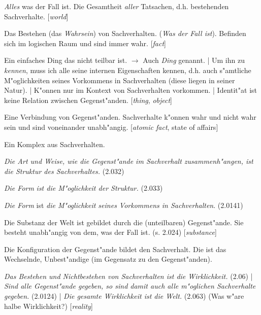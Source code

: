 \documentclass[]{scrartcl}
\begin{document}
\begin{description}[leftmargin=!,labelwidth=\widthof{\bfseries Konfiguration}]
  \item[Welt] \emph{Alles} was der Fall ist. Die Gesamtheit \emph{aller} Tatsachen, d.h.  bestehenden Sachverhalte. [\emph{world}]
  \item[Tatsache] Das Bestehen (das \emph{Wahrsein}) von Sachverhalten. (\emph{Was der Fall ist}). Befinden sich im logischen Raum und sind immer wahr. [\emph{fact}]
  \item[Gegenstand] Ein einfaches Ding das nicht teilbar ist. $\rightarrow$ Auch \emph{Ding} genannt. | Um ihn zu \emph{kennen}, muss ich alle seine internen Eigenschaften kennen, d.h. auch s"amtliche M"oglichkeiten seines Vorkommens in Sachverhalten (diese liegen in seiner Natur). | K"onnen nur im Kontext von Sachverhalten vorkommen. | Identit"at ist keine Relation zwischen Gegenst"anden. [\emph{thing}, \emph{object}]
  \item[Sachverhalt] Eine Verbindung von Gegenst"anden. Sachverhalte k"onnen wahr und nicht wahr sein und sind voneinander unabh"angig. [\emph{atomic fact}, {state of affairs}]
  \item[Sachlage] Ein Komplex aus Sachverhalten.
  \item[Struktur] \emph{Die Art und Weise, wie die Gegenst"ande im Sachverhalt zusammenh"angen, ist die Struktur des Sachverhaltes.} (2.032)
  \item[Form des ??] \emph{Die Form} \emph{ist die M"oglichkeit der Struktur.} (2.033)  \item[Form des Gegenstands] \emph{Die Form} ist \emph{die M"oglichkeit seines Vorkommens in Sachverhalten}. (2.0141)
  \item[Substanz] Die Substanz der Welt ist gebildet durch die (unteilbaren) Gegenst"ande. Sie besteht unabh"angig von dem, was der Fall ist. (s. 2.024) [\emph{substance}]
  \item[Konfiguration] Die Konfiguration der Gegenst"ande bildet den Sachverhalt. Die ist das Wechselnde, Unbest"andige (im Gegensatz zu den Gegenst"anden).
  \item[Wirklichkeit] \emph{Das Bestehen und Nichtbestehen von Sachverhalten ist die Wirklichkeit.} (2.06) | \emph{Sind alle Gegenst"ande gegeben, so sind damit auch alle m"oglichen Sachverhalte gegeben.} (2.0124) | \emph{Die gesamte Wirklichkeit ist die Welt.} (2.063) {\color{red}(Was w"are halbe Wirklichkeit?)} [\emph{reality}]
\end{description}
\end{document}
